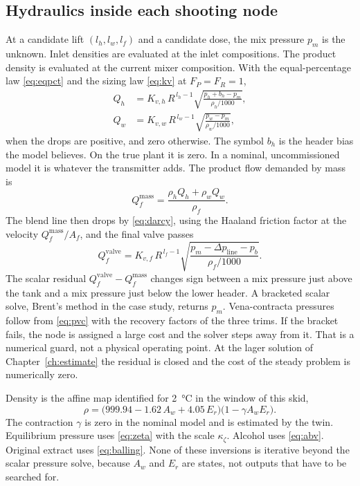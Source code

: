 \subsection{Hydraulics inside each shooting node}

At a candidate lift $(l_h,l_w,l_f)$ and a candidate dose, the mix pressure $p_m$ is the unknown. Inlet densities are evaluated at the inlet compositions. The product density is evaluated at the current mixer composition. With the equal-percentage law \eqref{eq:eqpct} and the sizing law \eqref{eq:kv} at $F_P=F_R=1$,
\begin{align}
\label{eq:qhw}
Q_h
&=
K_{v,h}\,R^{\,l_h-1}
\sqrt{\frac{p_h + b_h - p_m}{\rho_h/1000}},
\\
Q_w
&=
K_{v,w}\,R^{\,l_w-1}
\sqrt{\frac{p_w - p_m}{\rho_w/1000}},
\end{align}
when the drops are positive, and zero otherwise. The symbol $b_h$ is the header bias the model believes. On the true plant it is zero. In a nominal, uncommissioned model it is whatever the transmitter adds. The product flow demanded by mass is
\begin{equation}
\label{eq:qfmass}
Q_f^{\mathrm{mass}}
=
\frac{\rho_h Q_h + \rho_w Q_w}{\rho_f}.
\end{equation}
The blend line then drops by \eqref{eq:darcy}, using the Haaland friction factor at the velocity $Q_f^{\mathrm{mass}}/A_f$, and the final valve passes
\begin{equation}
\label{eq:qfvalve}
Q_f^{\mathrm{valve}}
=
K_{v,f}\,R^{\,l_f-1}
\sqrt{\frac{p_m - \Delta p_{\mathrm{line}} - p_b}{\rho_f/1000}}.
\end{equation}
The scalar residual $Q_f^{\mathrm{valve}} - Q_f^{\mathrm{mass}}$ changes sign between a mix pressure just above the tank and a mix pressure just below the lower header. A bracketed scalar solve, Brent's method in the case study, returns $p_m$. Vena-contracta pressures follow from \eqref{eq:pvc} with the recovery factors of the three trims. If the bracket fails, the node is assigned a large cost and the solver steps away from it. That is a numerical guard, not a physical operating point. At the lager solution of Chapter~\ref{ch:estimate} the residual is closed and the cost of the steady problem is numerically zero.

Density is the affine map identified for \SI{2}{\celsius} in the window of this skid,
\begin{equation}
\label{eq:rho}
\rho
=
\big(999.94 - 1.62\,A_w + 4.05\,E_r\big)
\big(1 - \gamma A_w E_r\big).
\end{equation}
The contraction $\gamma$ is zero in the nominal model and is estimated by the twin. Equilibrium pressure uses \eqref{eq:zeta} with the scale $\kappa_{\zeta}$. Alcohol uses \eqref{eq:abv}. Original extract uses \eqref{eq:balling}. None of these inversions is iterative beyond the scalar pressure solve, because $A_w$ and $E_r$ are states, not outputs that have to be searched for.

